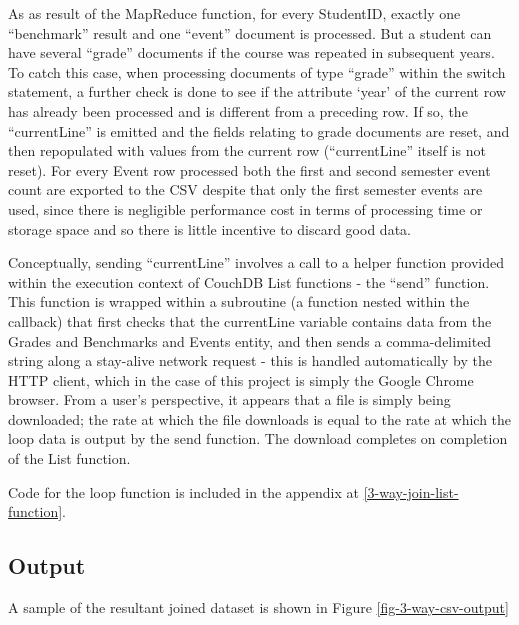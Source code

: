 As as result of the MapReduce function, for every StudentID, exactly one ``benchmark'' result and one ``event'' document is processed. But a student can have several ``grade'' documents if the course was repeated in subsequent years. To catch this case, when processing documents of type ``grade'' within the switch statement, a further check is done to see if the attribute `year' of the current row has already been processed and is different from a preceding row. If so, the ``currentLine'' is emitted and the fields relating to grade documents are reset, and then repopulated with values from the current row (``currentLine'' itself is not reset). For every Event row processed both the first and second semester event count are exported to the CSV despite that only the first semester events are used, since there is negligible performance cost in terms of processing time or storage space and so there is little incentive to discard good data.

Conceptually, sending ``currentLine'' involves a call to a helper function provided within the execution context of CouchDB List functions - the ``send'' function. This function is wrapped within a subroutine (a function nested within the callback) that first checks that the currentLine variable contains data from the Grades and Benchmarks and Events entity, and then sends a comma-delimited string along a stay-alive network request - this is handled automatically by the HTTP client, which in the case of this project is simply the Google Chrome browser. From a user's perspective, it appears that a file is simply being downloaded; the rate at which the file downloads is equal to the rate at which the loop data is output by the send function. The download completes on completion of the List function.

Code for the loop function is included in the appendix at \ref{3-way-join-list-function}.

\subsection{Output}
A sample of the resultant joined dataset is shown in Figure \ref{fig-3-way-csv-output}
